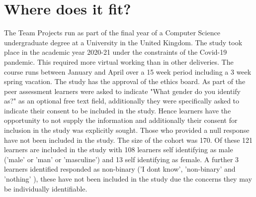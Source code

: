 \documentclass[sigconf, anonymous=true]{acmart}
\begin{document}
\section{Where does it fit?}
The Team Projects run as part of the final year of a Computer Science undergraduate degree at a University in the United Kingdom. The study took place in the academic year 2020-21 under the constraints of the Covid-19 pandemic. This required more virtual working than in other deliveries. The course runs between January and April over a 15 week period including a 3 week spring vacation. The study has the approval of the ethics board.  As part of the peer assessment learners were asked to indicate "What gender do you identify as?" as an optional free text field, additionally they were specifically asked to indicate their consent to be included in the study. Hence learners have the opportunity to not supply the information and additionally their consent for inclusion in the study was explicitly sought. Those who provided a null response have not been included in the study. The size of the cohort was 170. Of these 121 learners are included in the study with 108 learners self identifying as male ('male' or 'man' or 'masculine') and 13 self identifying as female. A further 3 learners identified responded as non-binary ('I dont know', 'non-binary' and 'nothing' ), these have not been included in the study due the concerns they may be individually identifiable.
\end{document}
